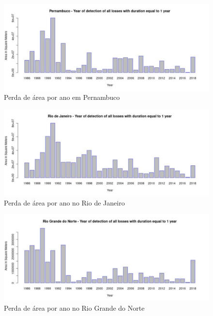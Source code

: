 \begin{figure}[H]
    \centering
    \includegraphics[scale=.5]{images/loss_graphics/Pernambuco_loss_eq1.pdf}
    \caption{Perda de área por ano em Pernambuco}
    \label{fig:loss_pernambuco}
\end{figure}

\begin{figure}[H]
    \centering
    \includegraphics[scale=.5]{images/loss_graphics/Rio de Janeiro_loss_eq1.pdf}
    \caption{Perda de área por ano no Rio de Janeiro}
    \label{fig:loss_rio_de_janeiro}
\end{figure}

\begin{figure}[H]
    \centering
    \includegraphics[scale=.5]{images/loss_graphics/Rio Grande do Norte_loss_eq1.pdf}
    \caption{Perda de área por ano no Rio Grande do Norte}
    \label{fig:loss_rio_grande_do_norte}
\end{figure}

